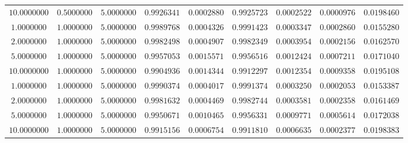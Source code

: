 \begin{tabular}{ccccccccc}
$10.0000000$ & $0.5000000$ & $5.0000000$ & $0.9926341$ & $0.0002880$ & $0.9925723$ & $0.0002522$ & $0.0000976$ & $0.0198460$\\
$1.0000000$ & $1.0000000$ & $5.0000000$ & $0.9989768$ & $0.0004326$ & $0.9991423$ & $0.0003347$ & $0.0002860$ & $0.0155280$\\
$2.0000000$ & $1.0000000$ & $5.0000000$ & $0.9982498$ & $0.0004907$ & $0.9982349$ & $0.0003954$ & $0.0002156$ & $0.0162570$\\
$5.0000000$ & $1.0000000$ & $5.0000000$ & $0.9957053$ & $0.0015571$ & $0.9956516$ & $0.0012424$ & $0.0007211$ & $0.0171040$\\
$10.0000000$ & $1.0000000$ & $5.0000000$ & $0.9904936$ & $0.0014344$ & $0.9912297$ & $0.0012354$ & $0.0009358$ & $0.0195108$\\
$1.0000000$ & $1.0000000$ & $5.0000000$ & $0.9990374$ & $0.0004017$ & $0.9991374$ & $0.0003250$ & $0.0002053$ & $0.0153387$\\
$2.0000000$ & $1.0000000$ & $5.0000000$ & $0.9981632$ & $0.0004469$ & $0.9982744$ & $0.0003581$ & $0.0002358$ & $0.0161469$\\
$5.0000000$ & $1.0000000$ & $5.0000000$ & $0.9950671$ & $0.0010465$ & $0.9956331$ & $0.0009771$ & $0.0005614$ & $0.0172038$\\
$10.0000000$ & $1.0000000$ & $5.0000000$ & $0.9915156$ & $0.0006754$ & $0.9911810$ & $0.0006635$ & $0.0002377$ & $0.0198383$\\
\end{tabular}
